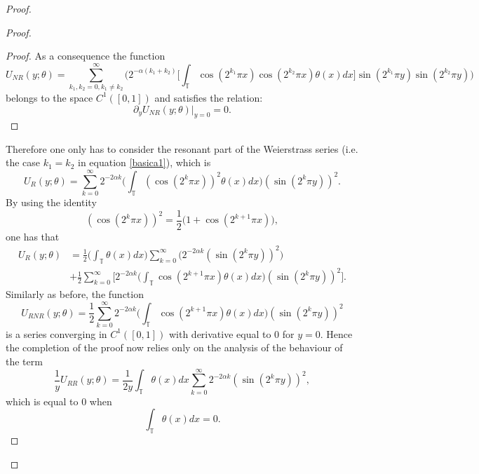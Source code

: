 \documentclass[12pt,a4paper]{article}
\theoremstyle{definition}
\theoremstyle{remark}
\numberwithin{equation}{section}
\def \del {\partial}
\begin{document}
\begin{proof}
\begin{proof}
\begin{proof}
As a consequence  the function
\begin{equation*}
U_{NR}(y;\theta)= \sum_{k_1,k_2=0 , k_1\not=k_2}^\infty \bigg(2^{-\alpha (k_1 + k_2)} \bigg[ \int_{\mathbb{T}} \cos(2^{k_1}\pi x)  \cos(2^{k_2}\pi  x)\theta (x) dx \bigg] \sin(2^{k_1} \pi y)  \sin(2^{k_2} \pi y) \bigg)  
\end{equation*}
belongs to the space $C^{1}([0,1])$ and satisfies the relation:
\begin{equation}
\del_y U_{NR} (y;\theta) \lvert_{y=0} =0.
\end{equation}

\end{proof}
Therefore one only has to consider the resonant part of the Weierstrass series (i.e. the case $k_1 = k_2$ in equation \eqref{basica1}), which is
\begin{equation}
U_R(y;\theta) =  \sum_{k=0 }^\infty 2^{-2\alpha k} \bigg( \int_{\mathbb{T}} (\cos(2^{k } \pi  x)  )^2  \theta (x) dx \bigg)  (\sin(2^{k } \pi y))^2.
\end{equation}
By using the identity
\begin{equation}
 (\cos(2^{k } \pi x)  )^2=\frac12 \bigg(1+ \cos(2^{k+1 } \pi  x)  \bigg),
\end{equation}
one has that
\begin{align*}
U_R(y;\theta) &= \frac12 \bigg( \int_{\mathbb{T}} \theta (x) dx \bigg) \sum_{k =0}^\infty \bigg( 2^{-2\alpha k} (\sin(2^{k }\pi y) )^2 \bigg) \\
&+ \frac{1}{2} \sum_{k =0}^\infty \bigg[ 2^{-2\alpha k} \bigg( \int_{\mathbb{T}} \cos(2^{k +1}  \pi x)    \theta (x) dx \bigg) (\sin(2^{k } \pi y))^2 \bigg].
\end{align*}
Similarly as before, the function
\begin{equation}
U_{RNR}(y;\theta)= \frac{1}{2} \sum_{k=0}^\infty 2^{-2\alpha k} \bigg( \int_{\mathbb{T}} \cos(2^{k +1}\pi  x) \theta (x) dx \bigg)  (\sin(2^{k } \pi y))^2
\end{equation}
is a series converging in $C^{1}([0,1]) $ with derivative equal to $0$ for $y=0$.
Hence the completion of the proof now relies only on the analysis of the behaviour of the term
\begin{equation}
\frac{1}{y} U_{RR}(y;\theta)= \frac{1}{2y} \int_{\mathbb{T}} \theta (x) dx \sum_{k=0 }^\infty 2^{-2\alpha k} (\sin(2^{k } \pi y))^2,
\end{equation}
which is equal to $0$ when 
\begin{equation}
\int_{\mathbb{T}} \theta (x) dx =0.
\end{equation}

\end{proof}
\end{proof}
\end{document}
